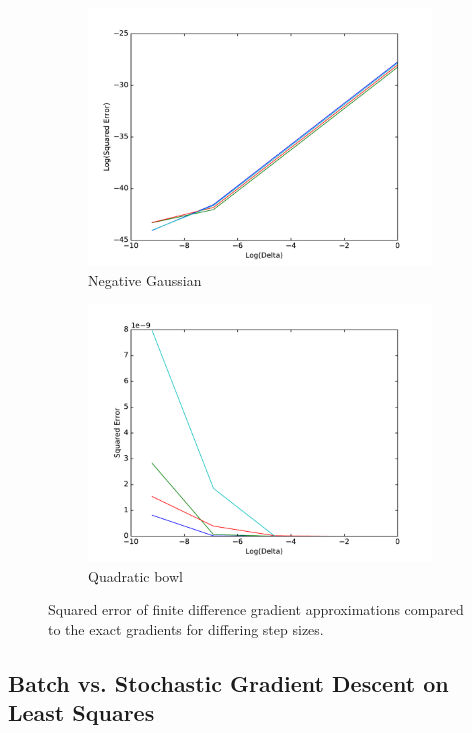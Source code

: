 \documentclass[10pt,psamsfonts]{amsart}
\theoremstyle{definition}
\theoremstyle{remark}
\numberwithin{equation}{section}
\begin{document}
\begin{figure}
\begin{subfigure}[b]{0.3\textwidth}
	\includegraphics[width=\textwidth]{hw1_1-2a.pdf}
	\caption{Negative Gaussian}
\end{subfigure}
\begin{subfigure}[b]{0.3\textwidth}
	\includegraphics[width=\textwidth]{hw1_1-2b.pdf}
	\caption{Quadratic bowl}
\end{subfigure}
\caption{Squared error of finite difference gradient approximations compared to the exact gradients for differing step sizes.}
\end{figure}

\subsection{Batch vs. Stochastic Gradient Descent on Least Squares}
\end{document}
